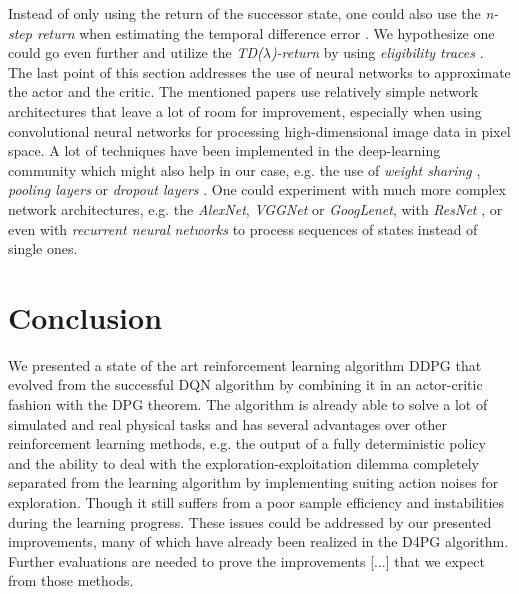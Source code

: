 Instead of only using the return of the successor state, one could also use the \textit{n-step return} when estimating the temporal difference error \citep{barth2018distributed}. We hypothesize one could go even further and utilize the \textit{TD($\lambda$)-return} by using \textit{eligibility traces} \citep{tesauro1995temporal}.\\
The last point of this section addresses the use of neural networks to approximate the actor and the critic. The mentioned papers use relatively simple network architectures that leave a lot of room for improvement, especially when using convolutional neural networks for processing high-dimensional image data in pixel space. A lot of techniques have been implemented in the deep-learning community which might also help in our case, e.g. the use of \textit{weight sharing} \citep{nowlan1992simplifying}, \textit{pooling layers} \citep{zeiler2013stochastic} or \textit{dropout layers} \citep{srivastava2014dropout}. One could experiment with much more complex network architectures, e.g. the \textit{AlexNet}, \textit{VGGNet} or \textit{GoogLenet}, with \textit{ResNet} \citep{he2016deep}, or even with \textit{recurrent neural networks} \citep{haykin1994neural} to process sequences of states instead of single ones. 


\section{Conclusion}
\label{sec:conclusion}
We presented a state of the art reinforcement learning algorithm DDPG that evolved from the successful DQN algorithm by combining it in an actor-critic fashion with the DPG theorem. The algorithm is already able to solve a lot of simulated and real physical tasks and has several advantages over other reinforcement learning methods, e.g. the output of a fully deterministic policy and the ability to deal with the exploration-exploitation dilemma completely separated from the learning algorithm by implementing suiting action noises for exploration. Though it still suffers from a poor sample efficiency and instabilities during the learning progress. These issues could be addressed by our presented improvements, many of which have already been realized in the D4PG algorithm. Further evaluations are needed to prove the improvements [...] that we expect from those methods.

\newpage



